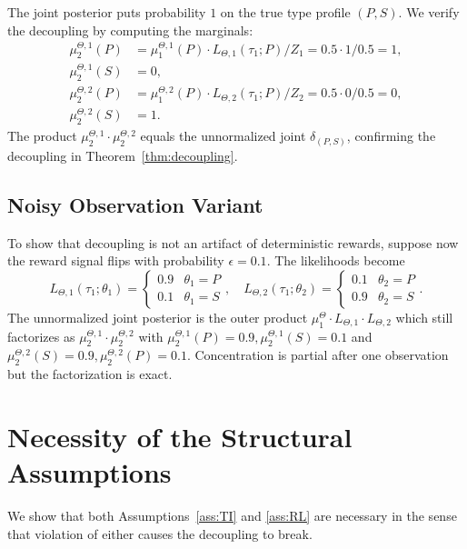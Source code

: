 \documentclass{article}
\begin{document}
The joint posterior puts probability $1$ on the true type profile $(P, S)$. We verify the decoupling by computing the marginals:
\begin{align}
\mu_2^{\Theta,1}(P) &= \mu_1^{\Theta,1}(P) \cdot L_{\Theta,1}(\tau_1; P) / Z_1 = 0.5 \cdot 1 / 0.5 = 1, \\
\mu_2^{\Theta,1}(S) &= 0, \\
\mu_2^{\Theta,2}(P) &= \mu_1^{\Theta,2}(P) \cdot L_{\Theta,2}(\tau_1; P) / Z_2 = 0.5 \cdot 0 / 0.5 = 0, \\
\mu_2^{\Theta,2}(S) &= 1.
\end{align}
The product $\mu_2^{\Theta,1} \cdot \mu_2^{\Theta,2}$ equals the unnormalized joint $\delta_{(P,S)}$, confirming the decoupling in Theorem~\ref{thm:decoupling}.

\subsection{Noisy Observation Variant}

To show that decoupling is not an artifact of deterministic rewards, suppose now the reward signal flips with probability $\epsilon = 0.1$. The likelihoods become
\begin{equation}
L_{\Theta,1}(\tau_1; \theta_1) = \begin{cases} 0.9 & \theta_1 = P \\ 0.1 & \theta_1 = S \end{cases}, \quad
L_{\Theta,2}(\tau_1; \theta_2) = \begin{cases} 0.1 & \theta_2 = P \\ 0.9 & \theta_2 = S \end{cases}.
\end{equation}
The unnormalized joint posterior is the outer product $\mu_1^\Theta \cdot L_{\Theta,1} \cdot L_{\Theta,2}$ which still factorizes as $\mu_2^{\Theta,1} \cdot \mu_2^{\Theta,2}$ with $\mu_2^{\Theta,1}(P) = 0.9, \mu_2^{\Theta,1}(S) = 0.1$ and $\mu_2^{\Theta,2}(S) = 0.9, \mu_2^{\Theta,2}(P) = 0.1$. Concentration is partial after one observation but the factorization is exact.

\section{Necessity of the Structural Assumptions}
\label{sec:necessity}

We show that both Assumptions~\ref{ass:TI} and \ref{ass:RL} are necessary in the sense that violation of either causes the decoupling to break.
\end{document}
